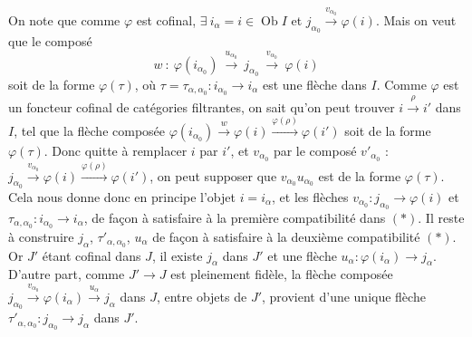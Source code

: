 \documentclass[11pt]{article}
\newcommand{\printedpage}[1]{\marginpar{\footnotesize p.~#1}}
\newcommand{\msp}[1]{\marginpar{\footnotesize [#1]}}
\newcommand{\Ob}{\operatorname{Ob}}
\begin{document}
On note que comme $\varphi$ est cofinal, $\exists\ i_\alpha=i\in\Ob I$ et $j_{\alpha_0}\xrightarrow{v_{\alpha_0}}\varphi(i)$. Mais on veut que le composé
\[
w\ :\ \varphi(i_{\alpha_0})\ \xrightarrow{u_{\alpha_0}}\ j_{\alpha_0}\ \xrightarrow{v_{\alpha_0}}\ \varphi(i)
\]
soit de la forme $\varphi(\tau)$, où $\tau=\tau_{\alpha,\alpha_0}:i_{\alpha_0}\longrightarrow i_\alpha$ est une flèche dans $I$. Comme $\varphi$ est un foncteur cofinal de catégories filtrantes, on sait
\printedpage{122}
\msp{page 322}
qu'on peut trouver $i\xrightarrow{\rho}i'$ dans $I$, tel que la flèche composée $\varphi(i_{\alpha_0})\xrightarrow{w}\varphi(i)\xrightarrow{\varphi(\rho)}\varphi(i')$ soit de la forme $\varphi(\tau)$. Donc quitte à remplacer $i$ par $i'$, et $v_{\alpha_0}$ par le composé $v'_{\alpha_0}$ : $j_{\alpha_0}\xrightarrow{v_{\alpha_0}}\varphi(i)\xrightarrow{\varphi(\rho)}\varphi(i')$, on peut supposer que $v_{\alpha_0}u_{\alpha_0}$ est de la forme $\varphi(\tau)$. Cela nous donne donc en principe l'objet $i=i_\alpha$, et les flèches $v_{\alpha_0}:j_{\alpha_0}\longrightarrow\varphi(i)$ et $\tau_{\alpha,\alpha_0}:i_{\alpha_0}\longrightarrow i_\alpha$, de façon à satisfaire à la première compatibilité dans $(*)$. Il reste à construire $j_\alpha$, $\tau'_{\alpha,\alpha_0}$, $u_\alpha$ de façon à satisfaire à la deuxième compatibilité $(*)$. Or $J'$ étant cofinal dans $J$, il existe $j_\alpha$ dans $J'$ et une flèche $u_\alpha:\varphi(i_\alpha)\longrightarrow j_\alpha$. D'autre part, comme $J'\longrightarrow J$ est pleinement fidèle, la flèche composée $j_{\alpha_0}\xrightarrow{v_{\alpha_0}}\varphi(i_\alpha)\xrightarrow{u_\alpha}j_\alpha$ dans $J$, entre objets de $J'$, provient d'une unique flèche $\tau'_{\alpha,\alpha_0}:j_{\alpha_0}\longrightarrow j_\alpha$ dans $J'$.

\msp{page 323}
\end{document}
